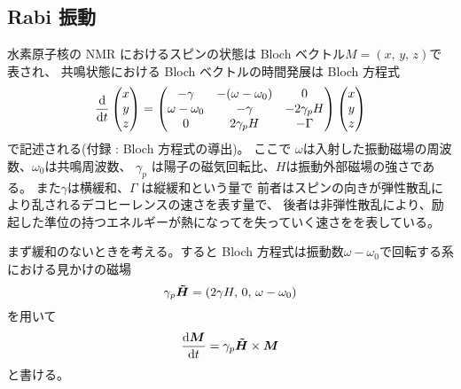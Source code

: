 \documentclass[11pt,dvipdfmx,a4paper]{jsarticle}
\begin{document}
\subsection{Rabi 振動}
水素原子核の NMR におけるスピンの状態は Bloch ベクトル\(M = (x,\,y,\,z)\)で表され、
共鳴状態における Bloch ベクトルの時間発展は Bloch 方程式
\begin{equation}
	\dv{t}
	\begin{pmatrix}
		x\\ y\\ z
	\end{pmatrix}
	=
	\begin{pmatrix}
		-\gamma & -(\omega-\omega_0) & 0\\
		\omega -\omega_0 & -\gamma & -2\gamma_p H\\
		0 & 2\gamma_p H & -\Gamma
	\end{pmatrix}
	\begin{pmatrix}
		x\\ y\\ z
	\end{pmatrix}
\end{equation}
で記述される(付録 : Bloch 方程式の導出)。
ここで
\(\omega\)は入射した振動磁場の周波数、\(\omega_0\)は共鳴周波数、
\(\gamma_p\) は陽子の磁気回転比、\(H\)は振動外部磁場の強さである。
また\(\gamma\)は横緩和、\(\Gamma\) は縦緩和という量で
前者はスピンの向きが弾性散乱により乱されるデコヒーレンスの速さを表す量で、
後者は非弾性散乱により、励起した準位の持つエネルギーが熱になってを失っていく速さをを表している。

まず緩和のないときを考える。すると Bloch 方程式は振動数\(\omega-\omega_0\)で回転する系における見かけの磁場
\begin{equation}
	\gamma_p \vb*{\tilde{H}} = \qty(2\gamma H,\,0,\,\omega-\omega_0)
\end{equation}
を用いて
\begin{equation}
	\dv{\vb*{M}}{t} = \gamma_p \vb*{\tilde{H}} \times \vb*{M}
\end{equation}
と書ける。
\end{document}
